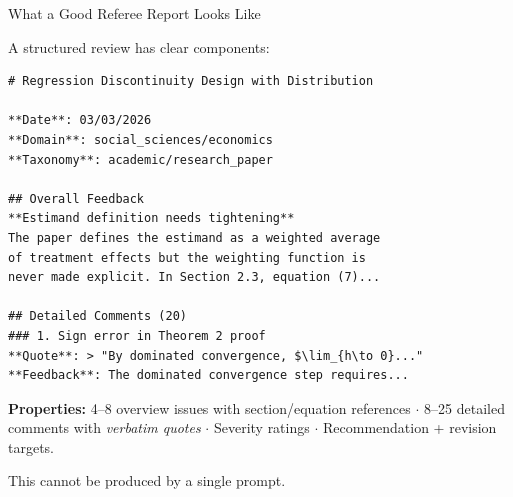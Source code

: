 \documentclass[10pt,english,aspectratio=169]{beamer}
\begin{document}
\begin{frame}[fragile]{What a Good Referee Report Looks Like}

A structured review has clear components:

\vspace{0.2cm}
\begin{tcolorbox}[colback=gray!5, colframe=gray!40, title={\footnotesize Example: refine.ink output format}, fonttitle=\bfseries\footnotesize]
\begin{lstlisting}[style=markdownstyle, basicstyle=\ttfamily\scriptsize]
# Regression Discontinuity Design with Distribution

**Date**: 03/03/2026
**Domain**: social_sciences/economics
**Taxonomy**: academic/research_paper

## Overall Feedback
**Estimand definition needs tightening**
The paper defines the estimand as a weighted average
of treatment effects but the weighting function is
never made explicit. In Section 2.3, equation (7)...

## Detailed Comments (20)
### 1. Sign error in Theorem 2 proof
**Quote**: > "By dominated convergence, $\lim_{h\to 0}..."
**Feedback**: The dominated convergence step requires...
\end{lstlisting}
\end{tcolorbox}

\vspace{0.2cm}
\textbf{Properties:} 4--8 overview issues with section/equation references $\cdot$ 8--25 detailed comments with \emph{verbatim quotes} $\cdot$ Severity ratings $\cdot$ Recommendation + revision targets.

\vspace{0.1cm}
This cannot be produced by a single prompt.

\end{frame}
\end{document}
